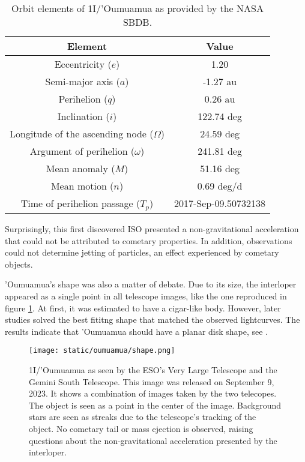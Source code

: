 \begin{table}[H]
  \centering
  \begin{tabular}{|c|c|}
    \hline
    Element & Value \\
    \hline
    Eccentricity ($e$) & 1.20 \\
    Semi-major axis ($a$) & -1.27 au \\
    Perihelion ($q$) & 0.26 au \\
    Inclination ($i$) & 122.74 deg \\
    Longitude of the ascending node ($\Omega$) & 24.59 deg \\
    Argument of perihelion ($\omega$) & 241.81 deg \\
    Mean anomaly ($M$) & 51.16 deg \\
    Mean motion ($n$) & 0.69 deg/d \\
    Time of perihelion passage ($T_p$) & 2017-Sep-09.50732138 \\
    \hline
  \end{tabular}
  \caption{Orbit elements of 1I/'Oumuamua as provided by the NASA SBDB.}
  \label{tab:oumuamua_elements}
\end{table}

Surprisingly, this first discovered ISO presented a non-gravitational
acceleration that could not be attributed to cometary properties. In addition,
observations could not determine jetting of particles, an effect experienced by
cometary objects.

'Oumuamua's shape was also a matter of debate. Due to its size, the interloper
appeared as a single point in all telescope images, like the one reproduced in
figure \ref{fig:oumuamua_shape}. At first, it was estimated to have a cigar-like
body. However, later studies solved the best fititng shape that matched the
observed lightcurves. The results indicate that 'Oumuamua should have a planar
disk shape, see \cite{seligman2022}.

\begin{figure}[H]
  \centering
  \texttt{[image: static/oumuamua/shape.png]}
\caption['Oumuamua as seen by the ESO's VLT and GST telescopes]{
  1I/'Oumuamua as seen by the ESO's Very Large Telescope and the Gemini South
  Telescope. This image was released on September 9, 2023. It shows a
  combination of images taken by the two telecopes. The object is seen as
  a point in the center of the image. Background stars are seen as streaks
  due to the telescope's tracking of the object. No cometary tail or mass
  ejection is observed, raising questions about the non-gravitational
  acceleration presented by the interloper.
  }
  \label{fig:oumuamua_shape}
\end{figure}

